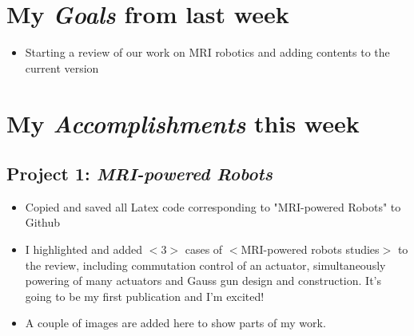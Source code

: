 \newcommand{\handoutName}{Weekly report}
\newcommand{\handoutdate}{\today}
\newcommand{\duedate}{}

\section{My \emph{Goals} from last week}
\begin{itemize}
\item Starting a review of our work on MRI robotics and adding contents to the current version

\end{itemize}

\section{My \emph{Accomplishments} this week}

\subsection{Project 1: \emph{MRI-powered Robots}}

\begin{itemize}
\item Copied and saved all Latex code corresponding to "MRI-powered Robots" to Github

\item I highlighted and added $<$3$>$ cases of $<$MRI-powered robots studies$>$ to the review, including commutation control of an actuator, simultaneously powering of many actuators and Gauss gun design and construction. It's going to be my first publication and I'm excited!
\item A couple of images are added here to show parts of my work.

\end{itemize}

